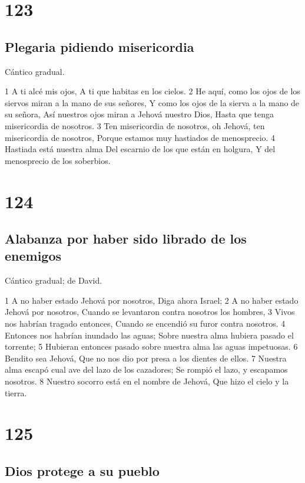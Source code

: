 \chapter{123}

\section*{Plegaria pidiendo misericordia}

Cántico gradual.

1 A ti alcé mis ojos,
A ti que habitas en los cielos.
2 He aquí, como los ojos de los siervos miran a la mano de sus señores,
Y como los ojos de la sierva a la mano de su señora,
Así nuestros ojos miran a Jehová nuestro Dios,
Hasta que tenga misericordia de nosotros.
3 Ten misericordia de nosotros, oh Jehová, ten misericordia de nosotros,
Porque estamos muy hastiados de menosprecio.
4 Hastiada está nuestra alma
Del escarnio de los que están en holgura,
Y del menosprecio de los soberbios.

\chapter{124}

\section*{Alabanza por haber sido librado de los enemigos}

Cántico gradual; de David.

1 A no haber estado Jehová por nosotros,
Diga ahora Israel;
2 A no haber estado Jehová por nosotros,
Cuando se levantaron contra nosotros los hombres,
3 Vivos nos habrían tragado entonces,
Cuando se encendió su furor contra nosotros.
4 Entonces nos habrían inundado las aguas;
Sobre nuestra alma hubiera pasado el torrente;
5 Hubieran entonces pasado sobre nuestra alma las aguas impetuosas.
6 Bendito sea Jehová,
Que no nos dio por presa a los dientes de ellos.
7 Nuestra alma escapó cual ave del lazo de los cazadores;
Se rompió el lazo, y escapamos nosotros.
8 Nuestro socorro está en el nombre de Jehová,
Que hizo el cielo y la tierra.

\chapter{125}

\section*{Dios protege a su pueblo}

